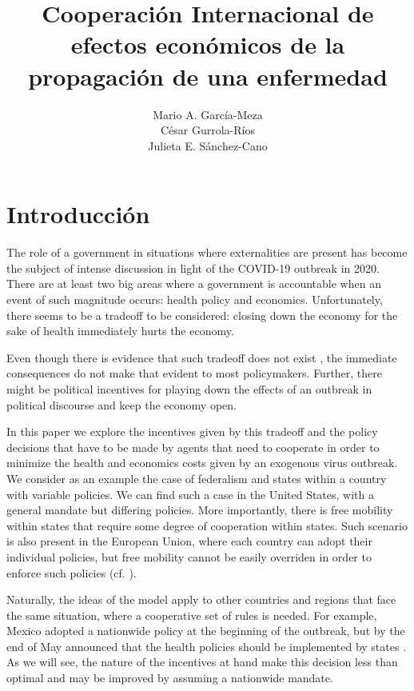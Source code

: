 \documentclass[11pt, oneside]{article}
\title{Cooperación Internacional de efectos económicos de la propagación de una enfermedad}
\author{Mario A. García-Meza\\ César Gurrola-Ríos \\ Julieta E. Sánchez-Cano}
\begin{document}
\maketitle


\section{Introducción}

The role of a government in situations where externalities are present has become the subject of intense discussion in light of the COVID-19 outbreak in 2020. There are at least two big areas where a government is accountable when an event of such magnitude occurs: health policy and economics. Unfortunately, there seems to be a tradeoff to be considered: closing down the economy for the sake of health immediately hurts the economy.

Even though there is evidence that such tradeoff does not exist \cite{Correia}, the immediate consequences do not make that evident to most policymakers. Further, there might be political incentives for playing down the effects of an outbreak in political discourse and keep the economy open.

In this paper we explore the incentives given by this tradeoff and the policy decisions that have to be made by agents that need to cooperate in order to minimize the health and economics costs given by an exogenous virus outbreak. We consider as an example the case of federalism and states within a country with variable policies. We can find such a case in the United States, with a general mandate but differing policies. More importantly, there is free mobility within states that require some degree of cooperation within states. Such scenario is also present in the European Union, where each country can adopt their individual policies, but free mobility cannot be easily overriden in order to enforce such policies (cf. \cite{EC-COVID}).

Naturally, the ideas of the model apply to other countries and regions that face the same situation, where a cooperative set of rules is needed. For example, Mexico adopted a nationwide policy at the beginning of the outbreak, but by the end of May announced that the health policies should be implemented by states \cite{SSA-NN}. As we will see, the nature of the incentives at hand make this decision less than optimal and may be improved by assuming a nationwide mandate.
\end{document}

